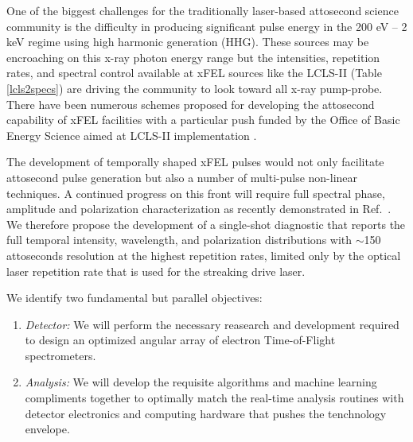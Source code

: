 One of the biggest challenges for the traditionally laser-based attosecond science community is the difficulty in producing significant pulse energy in the 200 eV -- 2 keV regime using high harmonic generation (HHG)\cite{Chen2014,Schmidt2016}.
These sources may be encroaching on this x-ray photon energy range \cite{Biegert2014,Zenghu2017} but the intensities, repetition rates, and spectral control available at xFEL sources like the LCLS-II (Table \ref{lcls2specs}) are driving the community to look toward all x-ray pump-probe. 
There have been numerous schemes proposed for developing the attosecond capability of xFEL facilities \cite{Ding2009,Xiang2009} with a particular push funded by the Office of Basic Energy Science aimed at LCLS-II implementation \cite{Marinelli2016,xLEAP}.

The development of temporally shaped xFEL pulses would not only facilitate attosecond pulse generation but also a number of multi-pulse non-linear techniques\cite{Review2017}.
A continued progress on this front \cite{Lutman13_twocolor,Marinelli13_twocolor,Allaria2014,Ding2015,Marinelli2015,HeaterShaping2016,Prince2016,Lutman2016,Marinelli2016} will require full spectral phase, amplitude and polarization characterization as recently demonstrated in Ref.~\cite{Nick2018}.
We therefore propose the development of a single-shot diagnostic that reports the full temporal intensity, wavelength, and polarization distributions with $\sim$150 attoseconds resolution at the highest repetition rates, limited only by the optical laser repetition rate that is used for the streaking drive laser.

We identify two fundamental but parallel objectives:
\begin{enumerate}
\item \emph{Detector:} We will perform the necessary reasearch and development required to design an optimized angular array of electron Time-of-Flight spectrometers.
\item \emph{Analysis:} We will develop the requisite algorithms and machine learning compliments together to optimally match the real-time analysis routines with detector electronics and computing hardware that pushes the tenchnology envelope.
\end{enumerate}

